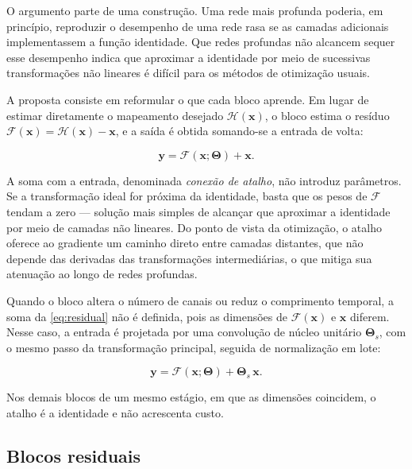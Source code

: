O argumento parte de uma construção. Uma rede mais profunda poderia, em
princípio, reproduzir o desempenho de uma rede rasa se as camadas
adicionais implementassem a função identidade. Que redes profundas não
alcancem sequer esse desempenho indica que aproximar a identidade por meio
de sucessivas transformações não lineares é difícil para os métodos de
otimização usuais.

A proposta consiste em reformular o que cada bloco aprende. Em lugar de
estimar diretamente o mapeamento desejado $\mathcal{H}(\mathbf{x})$, o bloco
estima o resíduo $\mathcal{F}(\mathbf{x}) = \mathcal{H}(\mathbf{x}) -
	\mathbf{x}$, e a saída é obtida somando-se a entrada de volta:

\begin{equation}
	\mathbf{y} = \mathcal{F}(\mathbf{x}; \boldsymbol{\Theta}) + \mathbf{x}.
	\label{eq:residual}
\end{equation}

A soma com a entrada, denominada \textit{conexão de atalho}, não introduz
parâmetros. Se a transformação ideal for próxima da identidade, basta que os
pesos de $\mathcal{F}$ tendam a zero --- solução mais simples de alcançar
que aproximar a identidade por meio de camadas não lineares. Do ponto de
vista da otimização, o atalho oferece ao gradiente um caminho direto entre
camadas distantes, que não depende das derivadas das transformações
intermediárias, o que mitiga sua atenuação ao longo de redes profundas.

Quando o bloco altera o número de canais ou reduz o comprimento temporal, a
soma da \autoref{eq:residual} não é definida, pois as dimensões de
$\mathcal{F}(\mathbf{x})$ e $\mathbf{x}$ diferem. Nesse caso, a entrada é
projetada por uma convolução de núcleo unitário $\boldsymbol{\Theta}_s$, com o
mesmo passo da transformação principal, seguida de normalização em lote:

\begin{equation}
	\mathbf{y} = \mathcal{F}(\mathbf{x}; \boldsymbol{\Theta}) +
	\boldsymbol{\Theta}_s \, \mathbf{x}.
	\label{eq:residual-projecao}
\end{equation}

Nos demais blocos de um mesmo estágio, em que as dimensões coincidem, o
atalho é a identidade e não acrescenta custo.

\subsection{Blocos residuais}
\label{subsec:fund-blocos}

